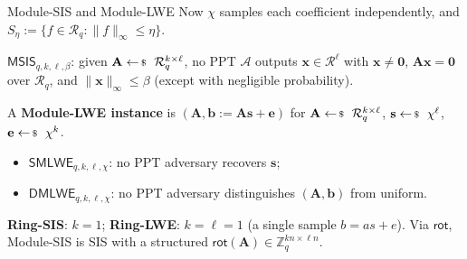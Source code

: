 \documentclass{zkdl-presentation-template}
\begin{document}
    \begin{frame}{Module-SIS and Module-LWE}
        Now $\chi$ samples each coefficient independently, and $S_{\eta} := \{f \in \mathcal{R}_q: \|f\|_{\infty} \leq \eta\}$.
        \begin{definition}
            $\mathsf{MSIS}_{q,k,\ell,\beta}$: given $\mathbf{A} \leftarrowS \mathcal{R}_q^{k \times \ell}$, no PPT $\mathcal{A}$ outputs $\mathbf{x} \in \mathcal{R}^{\ell}$ with $\mathbf{x} \neq \mathbf{0}$, $\mathbf{A}\mathbf{x} = \mathbf{0}$ over $\mathcal{R}_q$, and $\|\mathbf{x}\|_{\infty} \leq \beta$ (except with negligible probability).
        \end{definition}
        \pause

        \begin{definition}
            A \textbf{Module-LWE instance} is $(\mathbf{A}, \mathbf{b} := \mathbf{A}\mathbf{s}+\mathbf{e})$ for $\mathbf{A} \leftarrowS \mathcal{R}_q^{k \times \ell}$, $\mathbf{s} \leftarrowS \chi^{\ell}$, $\mathbf{e} \leftarrowS \chi^{k}$.
            \begin{itemize}
                \item $\mathsf{SMLWE}_{q,k,\ell,\chi}$: no PPT adversary recovers $\mathbf{s}$;
                \item $\mathsf{DMLWE}_{q,k,\ell,\chi}$: no PPT adversary distinguishes $(\mathbf{A},\mathbf{b})$ from uniform.
            \end{itemize}
        \end{definition}
        \pause

        \textbf{Ring-SIS}: $k=1$; \textbf{Ring-LWE}: $k=\ell=1$ (a single sample $b = as+e$). Via $\mathsf{rot}$, Module-SIS is SIS with a structured $\mathsf{rot}(\mathbf{A}) \in \mathbb{Z}_q^{kn \times \ell n}$.
    \end{frame}
\end{document}
